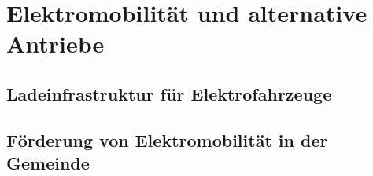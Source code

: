\section{Elektromobilität und alternative Antriebe}
\subsection{Ladeinfrastruktur für Elektrofahrzeuge}
\subsection{Förderung von Elektromobilität in der Gemeinde}

